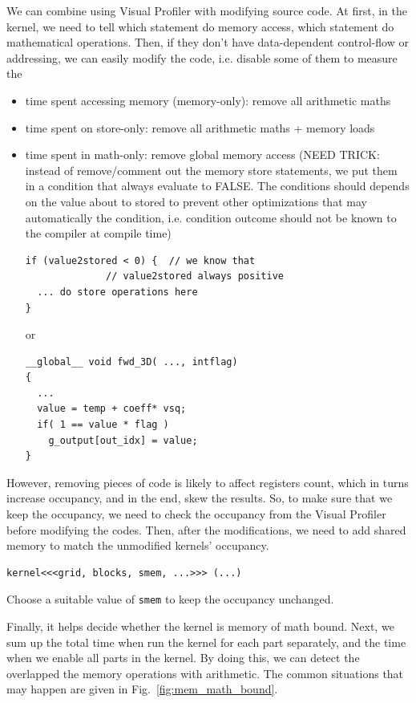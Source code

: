 We can combine using Visual Profiler with modifying source code.  At
first, in the kernel, we need to tell which statement do memory
access, which statement do mathematical operations. Then, if they
don't have data-dependent control-flow or addressing, we can easily
modify the code, i.e.  disable some of them to measure the
\begin{itemize}
\item time spent accessing memory  (memory-only): remove all
  arithmetic maths
\item time spent on store-only: remove all arithmetic maths + memory
  loads
\item time spent in math-only: remove global memory access (NEED
  TRICK: instead of remove/comment out the memory store statements, we
  put them in a condition that always evaluate to FALSE. The
  conditions should depends on the value about to stored to prevent
  other optimizations that may automatically the condition,
  i.e. condition outcome should not be known to the compiler at
  compile time)
\begin{lstlisting}
if (value2stored < 0) {  // we know that
              // value2stored always positive
  ... do store operations here
}
\end{lstlisting}
or
\begin{lstlisting}
__global__ void fwd_3D( ..., intflag)
{
  ...
  value = temp + coeff* vsq;
  if( 1 == value * flag )
    g_output[out_idx] = value;
}
\end{lstlisting}
\end{itemize}
However, removing pieces of code is likely to affect registers count,
which in turns increase occupancy, and in the end, skew the
results. So, to make sure that we keep the occupancy, we need to check
the occupancy from the Visual Profiler before modifying the
codes. Then, after the modifications, we need to add shared memory to
match the unmodified kernels' occupancy.
\begin{lstlisting}
kernel<<<grid, blocks, smem, ...>>> (...)
\end{lstlisting}
Choose a suitable value of \verb!smem! to keep the occupancy
unchanged. 

Finally, it helps decide whether the kernel is memory of math
bound. Next, we sum up the total time when run the kernel for each
part separately, and the time when we enable all parts in the
kernel. By doing this, we can detect the overlapped the memory
operations with arithmetic. The common situations that may happen are
given in Fig.~\ref{fig:mem_math_bound}.

